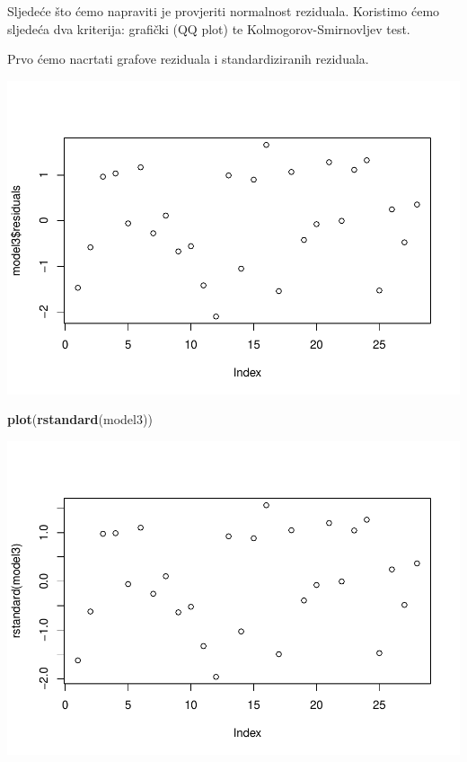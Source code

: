\documentclass[]{article}
\newenvironment{Shaded}{\begin{snugshade}}{\end{snugshade}}
\newcommand{\KeywordTok}[1]{\textcolor[rgb]{0.13,0.29,0.53}{\textbf{{#1}}}}
\newcommand{\NormalTok}[1]{{#1}}
\begin{document}
Sljedeće što ćemo napraviti je provjeriti normalnost reziduala.
Koristimo ćemo sljedeća dva kriterija: grafički (QQ plot) te
Kolmogorov-Smirnovljev test.

Prvo ćemo nacrtati grafove reziduala i standardiziranih reziduala.

\begin{Shaded}
\end{Shaded}

\includegraphics{Izvjestaj_files/figure-latex/unnamed-chunk-37-1.pdf}

\begin{Shaded}
\begin{Highlighting}[]
\KeywordTok{plot}\NormalTok{(}\KeywordTok{rstandard}\NormalTok{(model3))}
\end{Highlighting}
\end{Shaded}

\includegraphics{Izvjestaj_files/figure-latex/unnamed-chunk-37-2.pdf}
\end{document}
